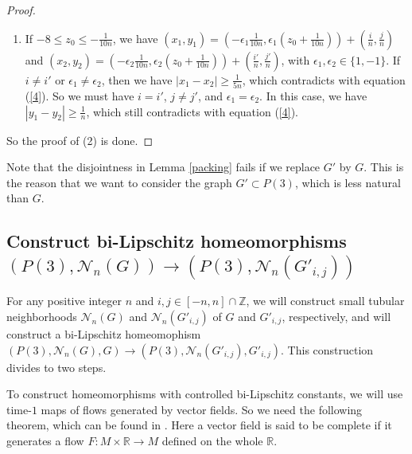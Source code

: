 \documentclass{amsart}
\begin{document}
\begin{proof}
\begin{enumerate}
\item If $-8\leq z_0\leq -\frac{1}{10n}$,  we have $(x_1,y_1)=(-\epsilon_1\frac{1}{10n},\epsilon_1(z_0+\frac{1}{10n}))+(\frac{i}{n},\frac{j}{n})$ and $(x_2,y_2)=(-\epsilon_2\frac{1}{10n},\epsilon_2(z_0+\frac{1}{10n}))+(\frac{i'}{n},\frac{j'}{n})$, with $\epsilon_1,\epsilon_2\in \{1,-1\}$.  If $i\ne i'$ or $\epsilon_1\ne \epsilon_2$, then we have $|x_1-x_2|\geq \frac{1}{5n}$, which contradicts with equation (\ref{4}). So we must have $i=i'$, $j\ne j'$, and $\epsilon_1=\epsilon_2$. In this case, we have $|y_1-y_2|\geq \frac{1}{n}$, which still contradicts with equation (\ref{4}).
\end{enumerate}

So the proof of (2) is done.
\end{proof}





Note that the disjointness in Lemma \ref{packing} fails if we replace $G'$ by $G$. This is the reason that we want to consider the graph $G'\subset P(3)$, which is less natural than $G$.

\subsection{Construct bi-Lipschitz homeomorphisms $(P(3),\mathcal{N}_n(G))\to (P(3),\mathcal{N}_n(G'_{i,j}))$}

For any positive integer $n$ and $i,j\in [-n,n]\cap \mathbb{Z}$, we will construct small tubular neighborhoods $\mathcal{N}_n(G)$ and $\mathcal{N}_n(G'_{i,j})$ of $G$ and $G'_{i,j}$, respectively, and will construct a bi-Lipschitz homeomophism $(P(3),\mathcal{N}_n(G),G)\to (P(3),\mathcal{N}_n(G'_{i,j}),G'_{i,j})$. This construction divides to two steps.


To construct homeomorphisms with controlled bi-Lipschitz constants, we will use time-$1$ maps of flows generated by vector fields. So we need the following theorem, which can be found in \cite[Theorem 2]{KSSV}. Here a vector field is said to be complete if it generates a flow $F: M\times \mathbb{R}\to M$ defined on the whole $\mathbb{R}$.
\end{document}
